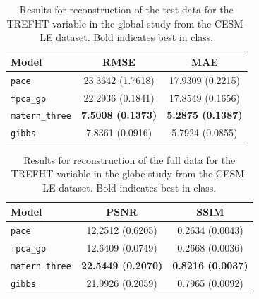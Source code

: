 \begin{table}
	\caption[Results for TREFHT variable on test data in the Global study]{Results for reconstruction of the test data for the TREFHT variable in the global study from the CESM-LE dataset. Bold indicates best in class.}
	\centering
	\label{tab:test_cesm_trefht_globe}
	\begin{tabular}{lcc}
		\toprule
		\textbf{Model} & \textbf{RMSE} & \textbf{MAE} \\
		\midrule
		\verb*|pace| & 23.3642	(1.7618) & 17.9309 (0.2215) \\
		\verb*|fpca_gp| & 22.2936	(0.1841) & 17.8549 (0.1656) \\
		\verb*|matern_three| & \textbf{7.5008 (0.1373)}& \textbf{5.2875 (0.1387)}\\
		\verb*|gibbs| & 7.8361 (0.0916) & 5.7924 (0.0855)\\
		\bottomrule
	\end{tabular}
\end{table}

\begin{table}
	\caption[Results for TREFHT variable on full data in the Global study]{Results for reconstruction of the full data for the TREFHT variable in the globe study from the CESM-LE dataset. Bold indicates best in class.}
	\centering
	\label{tab:full_cesm_trefht_globe}
	\begin{tabular}{lcc}
		\toprule
		\textbf{Model} & \textbf{PSNR} & \textbf{SSIM} \\
		\midrule
		\verb*|pace| & 12.2512 (0.6205) & 0.2634	(0.0043) \\
		\verb*|fpca_gp| & 12.6409 (0.0749) & 0.2668 (0.0036) \\
		\verb*|matern_three| & \textbf{22.5449	(0.2070)} & \textbf{0.8216 (0.0037)}\\
		\verb*|gibbs| & 21.9926 (0.2059) & 0.7965	(0.0092)\\
		\bottomrule
	\end{tabular}
\end{table}

